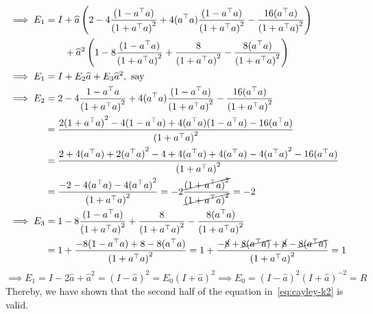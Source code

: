 \begin{align*}
    \implies
    E_1
     & =
    I
    + \widehat{a} \left( 2 - 4 \frac{(1 - a^{\top} a)}{{(1 + a^{\top} a)}^{2}} + 4 (a^{\top} a) \frac{(1 - a^{\top} a)}{{(1 + a^{\top} a)}^{2}} - \frac{16 (a^{\top} a)}{{(1 + a^{\top} a)}^{2}} \right)
    \\ & \qquad
    + \widehat{a}^{2} \left( 1 - 8 \frac{(1 - a^{\top} a)}{{(1 + a^{\top} a)}^{2}} + \frac{8}{{(1 + a^{\top} a)}^{2}} - \frac{8(a^{\top} a)}{{(1 + a^{\top} a)}^{2}} \right)
    \\
    \implies
    E_1
     & =
    I
    + E_2 \widehat{a}
    + E_3 \widehat{a}^{2},
    \text{ say}
    \\
    \implies
    E_2
     & =
    2 - 4 \frac{1 - a^{\top} a}{{(1 + a^{\top} a)}^{2}} + 4 (a^{\top} a) \frac{(1 - a^{\top} a)}{{(1 + a^{\top} a)}^{2}} - \frac{16 (a^{\top} a)}{{(1 + a^{\top} a)}^{2}}
    \\ & =
    \frac{
        2 {(1 + a^{\top} a)}^{2} - 4 (1 - a^{\top} a) + 4 (a^{\top} a) (1 - a^{\top} a) - 16 (a^{\top} a)
    }{{(1 + a^{\top} a)}^{2}}
    \\ & =
    \frac{
        2 + 4 (a^{\top} a) + 2 {(a^{\top} a)}^{2} - 4 + 4 (a^{\top} a) + 4 (a^{\top} a) - 4 {(a^{\top} a)}^{2} - 16 (a^{\top} a)
    }{{(1 + a^{\top} a)}^{2}}
    \\ & =
    \frac{
        -2 - 4 (a^{\top} a) - 4 {(a^{\top} a)}^{2}
    }{{(1 + a^{\top} a)}^{2}}
    =
    -2 \frac{\cancel{{(1 + a^{\top} a)}^{2}}}{\cancel{{(1 + a^{\top} a)}^{2}}}
    =
    -2
    \\
    \implies
    E_3
     & =
    1 - 8 \frac{(1 - a^{\top} a)}{{(1 + a^{\top} a)}^{2}} + \frac{8}{{(1 + a^{\top} a)}^{2}} - \frac{8(a^{\top} a)}{{(1 + a^{\top} a)}^{2}}
    \\ & =
    1 +
    \frac{
        - 8 (1 - a^{\top} a) + 8 - 8 (a^{\top} a)
    }{{(1 + a^{\top} a)}^{2}}
    =
    1 +
    \frac{
        - \cancel{8} + \cancel{8 (a^{\top} a)} + \cancel{8} - \cancel{8 (a^{\top} a)}
    }{{(1 + a^{\top} a)}^{2}}
    =
    1
\end{align*}
\begin{equation*}
    \implies
    E_1
    =
    I - 2 \widehat{a} + \widehat{a}^{2}
    =
    {(I - \widehat{a})}^{2}
    =
    E_0
    {(I + \widehat{a})}^{2}
    \implies
    E_0
    =
    {(I - \widehat{a})}^{2} {(I + \widehat{a})}^{-2}
    =
    R
\end{equation*}
Thereby, we have shown that the second half of the equation in~\eqref{eq:cayley-k2} is valid.
